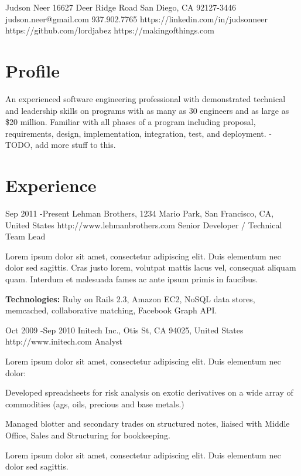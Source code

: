 \documentclass{article}
\begin{document}
\header
  {Judson Neer}
  {16627 Deer Ridge Road}
  {San Diego, CA 92127-3446}
  {judson.neer@gmail.com}
  {937.902.7765}
  {https://linkedin.com/in/judsonneer}
  {https://github.com/lordjabez}
  {https://makingofthings.com}


\section{Profile}

An experienced software engineering professional with demonstrated technical and leadership skills on programs with as many as 30 engineers and as large as \$20 million. Familiar with all phases of a program including proposal, requirements, design, implementation, integration, test, and deployment. - TODO, add more stuff to this.


\section{Experience}

\job
{Sep 2011 -}{Present}
{Lehman Brothers, 1234 Mario Park, San Francisco, CA, United States}
{http://www.lehmanbrothers.com}
{Senior Developer / Technical Team Lead}
{Lorem ipsum dolor sit amet, consectetur adipiscing elit. Duis elementum nec dolor sed sagittis. Cras justo lorem, volutpat mattis lacus vel, consequat aliquam quam. Interdum et malesuada fames ac ante ipsum primis in faucibus.\\
\rule{0mm}{5mm}\textbf{Technologies:} Ruby on Rails 2.3, Amazon EC2, NoSQL data stores, memcached, collaborative matching, Facebook Graph API.}

\job
{Oct 2009 -}{Sep 2010}
{Initech Inc., Otis St, CA 94025, United States}
{http://www.initech.com}
{Analyst}
{Lorem ipsum dolor sit amet, consectetur adipiscing elit. Duis elementum nec dolor:

\begin{itemize-noindent}
\item{Developed spreadsheets for risk analysis on exotic derivatives on a wide array of commodities (ags, oils, precious and base metals.)}
\item{Managed blotter and secondary trades on structured notes, liaised with Middle Office, Sales and Structuring for bookkeeping.}
\end{itemize-noindent}

Lorem ipsum dolor sit amet, consectetur adipiscing elit. Duis elementum nec dolor sed sagittis.}
\end{document}
